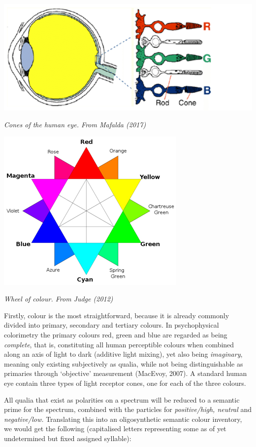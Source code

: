 
\begin{center}
\includegraphics[scale=0.3]{./Images/eyes.jpeg}

{\it \footnotesize Cones of the human eye. From Mafalda (2017)}

\includegraphics[scale=0.1]{./Images/colorwheel.jpg}

{\it \footnotesize Wheel of colour. From Judge (2012)}
\end{center}

\noindent Firstly, colour is the most straightforward, because it is already commonly divided into primary, secondary and tertiary colours. In psychophysical colorimetry the primary colours red, green and blue are regarded as being \textit{complete}, that is, constituting all human perceptible colours when combined along an axis of light to dark (additive light mixing), yet also being \textit{imaginary}, meaning only existing subjectively as qualia, while not being distinguishable as primaries through ‘objective’ measurement (MacEvoy, 2007). A standard human eye contain three types of light receptor cones, one for each of the three colours. 

All qualia that exist as polarities on a spectrum will be reduced to a semantic prime for the spectrum, combined with the particles for \textit{positive/high, neutral} and \textit{negative/low.} Translating this into an oligosynthetic semantic colour inventory, we would get the following (capitalised letters representing some as of yet undetermined but fixed assigned syllable): 

